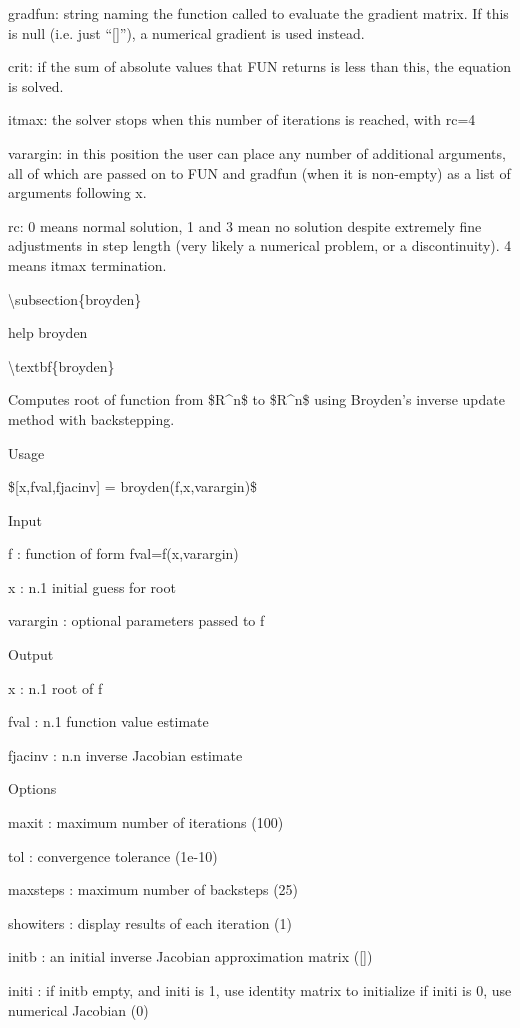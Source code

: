 \documentclass[10pt,math=newtx,citestyle=gb7714-2015,bibstyle=gb7714-2015]{elegantbook}
\begin{document}
	gradfun:  string naming the function called to evaluate the gradient matrix.  If this is null (i.e. just ``[]''), a numerical gradient is used instead.
	
	crit:     if the sum of absolute values that FUN returns is less than this, the equation is solved.
	
	itmax:    the solver stops when this number of iterations is reached, with rc=4
	
	varargin: in this position the user can place any number of additional arguments, all of which are passed on to FUN and gradfun (when it is non-empty) as a list of arguments following x.
	
	rc:       0 means normal solution, 1 and 3 mean no solution despite extremely fine adjustments in step length (very likely a numerical problem, or a discontinuity). 4 means itmax termination.
	
	
	\textbackslash{}subsection\{broyden\}
	
	help broyden
	
	\textbackslash{}textbf\{broyden\}
	
	Computes root of function from \$R\^{}n\$ to \$R\^{}n\$ using Broyden's inverse update method with backstepping.
	
	Usage
	
	\$[x,fval,fjacinv] = broyden(f,x,varargin)\$
	
	Input
	
	f         : function of form fval=f(x,varargin)
	
	x         : n.1 initial guess for root
	
	varargin  : optional parameters passed to f
	
	Output
	
	x         : n.1 root of f
	
	fval      : n.1 function value estimate
	
	fjacinv   : n.n inverse Jacobian estimate
	
	Options
	
	maxit     : maximum number of iterations (100)
	
	tol       : convergence tolerance (1e-10)
	
	maxsteps  : maximum number of backsteps (25)
	
	showiters : display results of each iteration (1)
	
	initb     : an initial inverse Jacobian approximation matrix ([])
	
	initi     : if initb empty, and initi is 1, use identity matrix to initialize if initi is 0, use numerical Jacobian (0)
	
\end{document}
